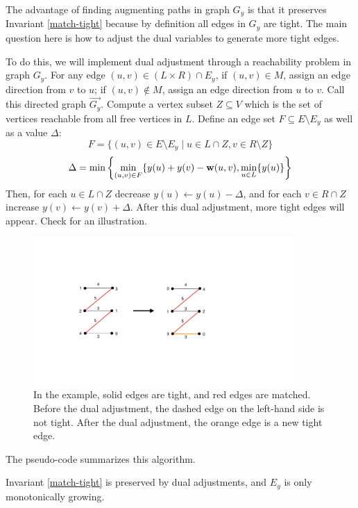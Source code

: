 The advantage of finding augmenting paths in graph $G_y$ is that it preserves Invariant \ref{match-tight} because by definition all edges in $G_y$ are tight. The main question here is how to adjust the dual variables to generate more tight edges.

To do this, we will implement dual adjustment through a reachability problem in graph $G_y$. For any edge $(u, v)\in (L\times R)\cap E_y$, if $(u, v)\in M$, assign an edge direction from $v$ to $u$; if $(u, v)\notin M$, assign an edge direction from $u$ to $v$. Call this directed graph $\overrightarrow{G_y}$. Compute a vertex subset $Z\subseteq V$ which is the set of vertices reachable from all free vertices in $L$. Define an edge set $F\subseteq E\setminus E_y$ as well as a value $\Delta$:
$$F = \{(u, v)\in E\setminus E_y\mid u\in L\cap Z, v\in R\setminus Z\}$$
$$\Delta = \min\left\{\min_{(u, v)\in F}\{y(u) + y(v) - \mathbf{w}(u, v), \min_{u\in L}\{y(u)\}\right\}$$
Then, for each $u\in L\cap Z$ decrease $y(u)\leftarrow y(u) - \Delta$, and for each $v\in R\cap Z$ increase $y(v)\leftarrow y(v) + \Delta$. After this dual adjustment, more tight edges will appear. Check  for an illustration.

\begin{figure}
	\centering
	\includegraphics[width=10cm]{fig/lecture_matching_dual}
	\caption{In the example, solid edges are tight, and red edges are matched. Before the dual adjustment, the dashed edge on the left-hand side is not tight. After the dual adjustment, the orange edge is a new tight edge.}
	\label{fig:dual}
\end{figure}

The pseudo-code  summarizes this algorithm.

\begin{observation}
	Invariant \ref{match-tight} is preserved by dual adjustments, and $E_y$ is only monotonically growing.
\end{observation}

